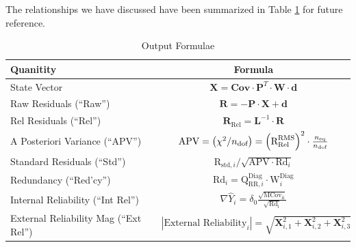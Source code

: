 The relationships we have discussed have been summarized in Table \ref{tab:outputs} for future reference.

\begin{table}[htb]
\caption{Output Formulae}
\label{tab:outputs}
\begin{center}
\begin{tabular}{lc}
\hline
\textbf{Quanitity}&\textbf{Formula}\\\hline
State Vector&$\mathbf{X}=\mathbf{Cov}\cdot\mathbf{P}^T\cdot\mathbf{W}\cdot\mathbf{d}$\\
Raw Residuals (``Raw'')&$\mathbf{R}=-\mathbf{P}\cdot\mathbf{X}+\mathbf{d}$\\
Rel Residuals (``Rel'')&$\mathbf{R}_{\text{Rel}}=\mathbf{L}^{-1}\cdot\mathbf{R}$\\
A Posteriori Variance (``APV'')&$\text{APV}=\left(\chi^2/n_{\text{dof}}\right)=\left(\text{R}_{\text{Rel}}^{\text{RMS}}\right)^2\cdot\frac{n_{\text{eq}}}{n_{\text{dof}}}$\\
Standard Residuals (``Std'')&$\text{R}_{\text{std},i}/\sqrt{\text{APV}\cdot\text{Rd}_i}$\\
Redundancy (``Red'cy'')&$\text{Rd}_i=\text{Q}_{\text{RR},i}^{\text{Diag}}\cdot\text{W}_i^{\text{Diag}}$\\
Internal Reliability (``Int Rel'')&$\nabla \hat{Y}_i = \delta_0 \frac{\sqrt{\text{MCov}_\text{ii}}}{\sqrt{\text{Rd}_\text{i}}}$\\
External Reliability Mag (``Ext Rel'')&$|\text{External Reliability}_i| = \sqrt{\mathbf{X}_{i,1}^2 + \mathbf{X}_{i,2}^2 + \mathbf{X}_{i,3}^2}$\\
\hline
\end{tabular}
\end{center}
\end{table}

